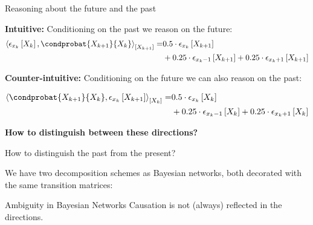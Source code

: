 \documentclass{beamer}
\begin{document}
    \begin{frame}{Reasoning about the future and the past}

        {\bf Intuitive:} Conditioning on the past we reason on the future:
        \begin{align*}
            \contractionof{\onehotmapofat{\catindexof{\catenumerator}}{\catvariableof{\catenumerator}},
                \condprobat{\catvariableof{\catenumerator+1}}{\catvariableof{\catenumerator}}
            }{\catvariableof{\catenumerator+1}}
            =
            &0.5 \cdot \onehotmapofat{\catindexof{\catenumerator}}{\catvariableof{\catenumerator+1}} \\
            &+ 0.25 \cdot \onehotmapofat{\catindexof{\catenumerator}-1}{\catvariableof{\catenumerator+1}}
            + 0.25 \cdot \onehotmapofat{\catindexof{\catenumerator}+1}{\catvariableof{\catenumerator+1}}
        \end{align*}

            {\bf Counter-intuitive:} Conditioning on the future we can also reason on the past:

        \begin{align*}
            \contractionof{
                \condprobat{\catvariableof{\catenumerator+1}}{\catvariableof{\catenumerator}},
                \onehotmapofat{\catindexof{\catenumerator}}{\catvariableof{\catenumerator+1}}
            }{\catvariableof{\catenumerator}}
            =
            &0.5 \cdot \onehotmapofat{\catindexof{\catenumerator}}{\catvariableof{\catenumerator}} \\
            &+ 0.25 \cdot \onehotmapofat{\catindexof{\catenumerator}-1}{\catvariableof{\catenumerator}}
            + 0.25 \cdot \onehotmapofat{\catindexof{\catenumerator}+1}{\catvariableof{\catenumerator}}
        \end{align*}
        \begin{center}
            \bf How to distinguish between these directions?
        \end{center}

    \end{frame}


    \begin{frame}{How to distinguish the past from the present?}

        We have two decomposition schemes as Bayesian networks, both decorated with the same transition matrices:

        

        \begin{block}{Ambiguity in Bayesian Networks}
            Causation is not (always) reflected in the directions.
        \end{block}

    \end{frame}
\end{document}

